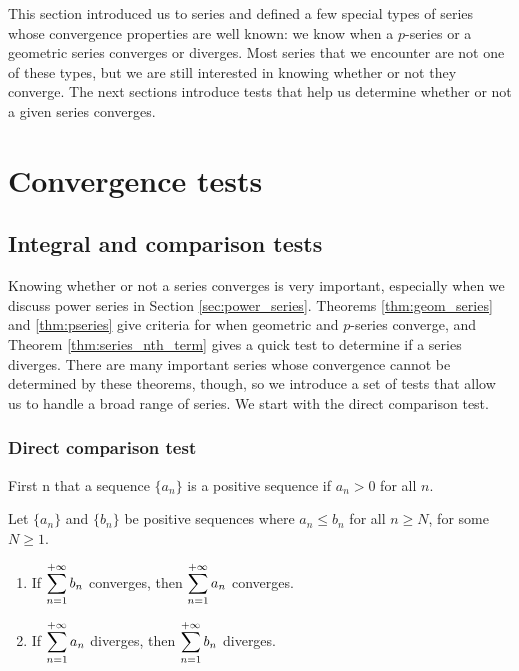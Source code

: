 This section introduced us to series and defined a few special types of series whose convergence properties are well known: we know when a $p$-series or a geometric series converges or diverges. Most series that we encounter are not one of these types, but we are still interested in knowing whether or not they converge. The next sections introduce tests that help us determine whether or not a given series converges. 

\section{Convergence tests}\label{sec:series_conv}




\subsection{Integral and comparison tests}\label{sec:int_comp_tests}

Knowing whether or not a series converges is very important, especially when we discuss power series in Section \ref{sec:power_series}. Theorems \ref{thm:geom_series} and \ref{thm:pseries} give criteria for when geometric and $p$-series converge, and Theorem \ref{thm:series_nth_term} gives a quick test to determine if a series diverges. There are many important series whose convergence cannot be determined by these theorems, though, so we introduce a set of tests that allow us to handle a broad range of series. We start with the direct comparison test.


\subsubsection{Direct comparison test}
First n that a sequence $\{a_n\}$ is a positive sequence if $a_n>0$ for all $n$.
\begin{theorem}\label{thm:series_direct_compare}
Let $\{a_n\}$ and $\{b_n\}$ be positive sequences where $a_n\leq b_n$ for all $n\geq N$, for some $N\geq 1$. 
	\begin{enumerate}
		\item If $\displaystyle \sum_{n=1}^{+\infty} b_n$ converges, then $\displaystyle \sum_{n=1}^{+\infty} a_n$ converges.
		\item	If $\displaystyle \sum_{n=1}^{+\infty} a_n$ diverges, then $\displaystyle \sum_{n=1}^{+\infty} b_n$ diverges.
	\end{enumerate}
\end{theorem}


